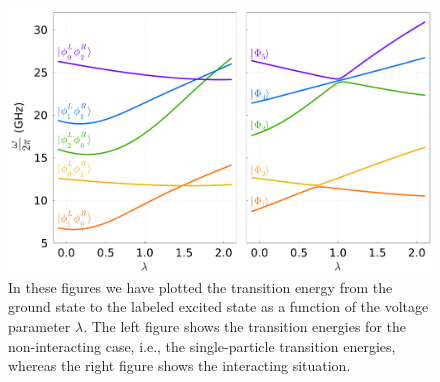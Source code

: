 \documentclass[twocolumn,superscriptaddress,unsortedaddress,
 amsmath,amssymb,
 aps,
]{revtex4-2}
\begin{document}
    \begin{figure}
        \includegraphics[width=\columnwidth]{figures/figure2.pdf}
        \caption{\label{fig:avoided-crossing}In these figures we have plotted the transition energy from
        the ground state to the labeled excited state as a function of the voltage
        parameter $\lambda$.
        The left figure %
        shows the transition energies for the non-interacting case, i.e., the single-particle
        transition energies, whereas the right figure %
        shows the interacting situation.}
    \end{figure}



\end{document}
